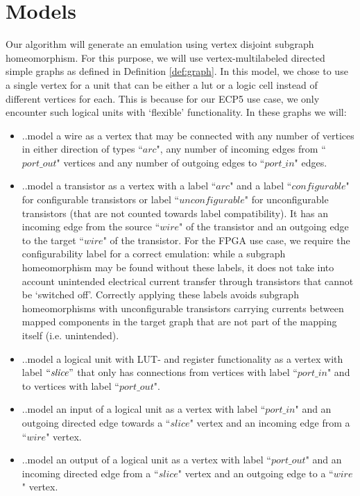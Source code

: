 \chapter{Models}
\label{sec:models}
Our algorithm will generate an emulation using vertex disjoint subgraph homeomorphism. For this purpose, we will use vertex-multilabeled directed simple graphs as defined in Definition \ref{def:graph}. In this model, we chose to use a single vertex for a unit that can be either a lut or a logic cell instead of different vertices for each. This is because for our ECP5 use case, we only encounter such logical units with `flexible' functionality. In these graphs we will:

\begin{itemize}
\item ..model a wire as a vertex that may be connected with any number of vertices in either direction of types ``$\mathit{arc}$", any number of incoming edges from ``$\mathit{port\_out}$" vertices and any number of outgoing edges to ``$\mathit{port\_in}$" edges.
\item ..model a transistor as a vertex with a label ``$\mathit{arc}$" and a label ``$\mathit{configurable}$" for configurable transistors or label ``$\mathit{unconfigurable}$" for unconfigurable transistors (that are not counted towards label compatibility). It has an incoming edge from the source ``$\mathit{wire}$" of the transistor and an outgoing edge to the target ``$\mathit{wire}$" of the transistor. For the FPGA use case, we require the configurability label for a correct emulation: while a subgraph homeomorphism may be found without these labels, it does not take into account unintended electrical current transfer through transistors that cannot be `switched off'. Correctly applying these labels avoids subgraph homeomorphisms with unconfigurable transistors carrying currents between mapped components in the target graph that are not part of the mapping itself (i.e. unintended).
\item ..model a logical unit with LUT- and register functionality as a vertex with label $``\mathit{slice}"$ that only has connections from vertices with label ``$\mathit{port\_in}$" and to vertices with label ``$\mathit{port\_out}$".
\item ..model an input of a logical unit as a vertex with label ``$\mathit{port\_in}$" and an outgoing directed edge towards a ``$\mathit{slice}$" vertex and an incoming edge from a ``$\mathit{wire}$" vertex.
\item ..model an output of a logical unit as a vertex with label ``$\mathit{port\_out}$" and an incoming directed edge from a ``$\mathit{slice}$" vertex and an outgoing edge to a ``$\mathit{wire}$" vertex.
\end{itemize}


